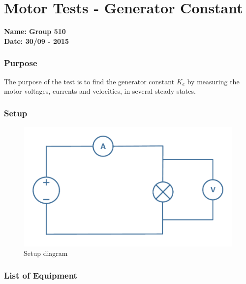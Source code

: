 \pagebreak
\section{Motor Tests - Generator Constant} \label{app:motorTestGeneratorConstant}
\textbf{Name: Group 510}\\
\textbf{Date: 30/09 - 2015}

\subsubsection{Purpose}
The purpose of the test is to find the generator constant $K_e$ by measuring the motor voltages, currents and velocities, in several steady states.

\subsubsection{Setup}
\begin{figure}[H]
  \centering
	\includegraphics[scale=0.5]{figures/MotorTest4.pdf}
	\caption{Setup diagram}
\end{figure}

\subsubsection{List of Equipment}

